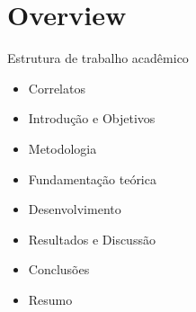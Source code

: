 \section{Overview}

\begin{frame}	
	\begin{block}{Estrutura de trabalho acadêmico}
		 \begin{itemize}
			  \item Correlatos			  
			  \item Introdução e Objetivos
			  \item Metodologia
			  \item Fundamentação teórica
			  \item Desenvolvimento
			  \item Resultados e Discussão
			  \item Conclusões
		      \item Resumo
		  \end{itemize}
	\end{block}
\end{frame}
